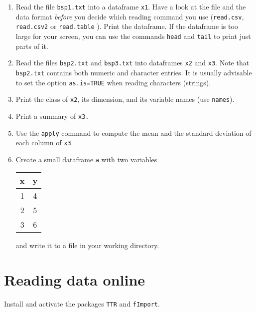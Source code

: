 \documentclass{article}
\begin{document}
\begin{enumerate}
\item Read the file \texttt{bsp1.txt} into a dataframe \texttt{x1}. Have a
look at the file and the data format \emph{before} you decide which reading
command you use (\texttt{read.csv}, \texttt{read.csv2} or \texttt{read.table}%
). Print the dataframe. If the dataframe is too large for your screen, you
can use the commands \texttt{head} and \texttt{tail} to print just parts of
it.

\item Read the files \texttt{bsp2.txt} and \texttt{bsp3.txt} into dataframes 
\texttt{x2} and \texttt{x3}. Note that \texttt{bsp2.txt} contains both
numeric and character entries. It is usually advisable to set the option 
\texttt{as.is=TRUE} when reading characters (strings).

\item Print the class of \texttt{x2}, its dimension, and its variable names
(use \texttt{names}).

\item Print a summary of \texttt{x3.}

\item Use the \texttt{apply} command to compute the mean and the standard
deviation of each column of \texttt{x3}.

\item Create a small dataframe \texttt{a} with two variables

\begin{center}%
\begin{tabular}{cc}
x & y \\ \hline
1 & 4 \\ 
2 & 5 \\ 
3 & 6%
\end{tabular}%
\end{center}%

and write it to a file in your working directory.
\end{enumerate}
\newpage


\section{Reading data online}

Install and activate the packages \texttt{TTR} and \texttt{fImport}.
\end{document}

